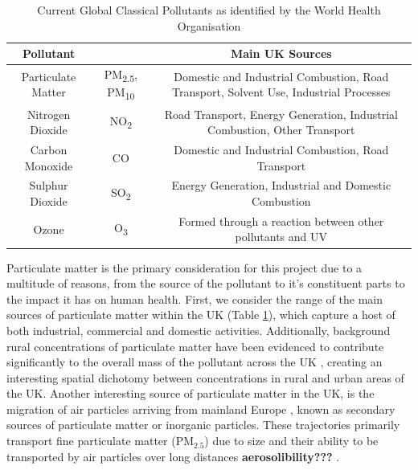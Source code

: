 \begin{table}[h!]
\centering
\begin{adjustbox}{width=1\textwidth}
\begin{tabular}{c c c} 
 Pollutant & & Main UK Sources \citep{UKGovernment2019Clean2019} \\ [0.5ex] 
 \hline
  Particulate Matter & PM\textsubscript{2.5}, PM\textsubscript{10} & Domestic and Industrial Combustion, Road Transport, Solvent Use, Industrial Processes \label{pm2.5source}   \\ 
  Nitrogen Dioxide & NO\textsubscript{2} & Road Transport, Energy Generation, Industrial Combustion, Other Transport \\
  Carbon Monoxide & CO & Domestic and Industrial Combustion, Road Transport   \\ 
  Sulphur Dioxide & SO\textsubscript{2} & Energy Generation, Industrial and Domestic Combustion  \\ 
  Ozone & O\textsubscript{3} & Formed through a reaction between other pollutants and UV  \\ [0.5ex] 
 \hline
\end{tabular}
\end{adjustbox}
\caption{Current Global Classical Pollutants as identified by the World Health Organisation \citep{WorldHealthOrganization2021WHOMonoxide}}
\label{table:2}
\end{table}

Particulate matter is the primary consideration for this project due to a multitude of reasons, from the source of the pollutant to it's constituent parts to the impact it has on human health. First, we consider the range of the main sources of particulate matter within the UK (Table \ref{table:2}), which capture a host of both industrial, commercial and domestic activities. Additionally, background rural concentrations of particulate matter have been evidenced to contribute significantly to the overall mass of the pollutant across the UK \citep{DepartmentforEnvironmentFoodRuralAffairs2021Environment2021}, creating an interesting spatial dichotomy between concentrations in rural and urban areas of the UK. Another interesting source of particulate matter in the UK, is the migration of air particles arriving from mainland Europe \citep{Malcolm2000ModellingUK, Abdalmogith2006IntercomparisonModel,Vieno2014TheUK}, known as secondary sources of particulate matter or inorganic particles. These trajectories primarily transport fine particulate matter (PM$_{2.5}$) due to size and their ability to be transported by air particles over long distances \textbf{aerosolibility???} \citep{Vieno2014TheUK}. 

